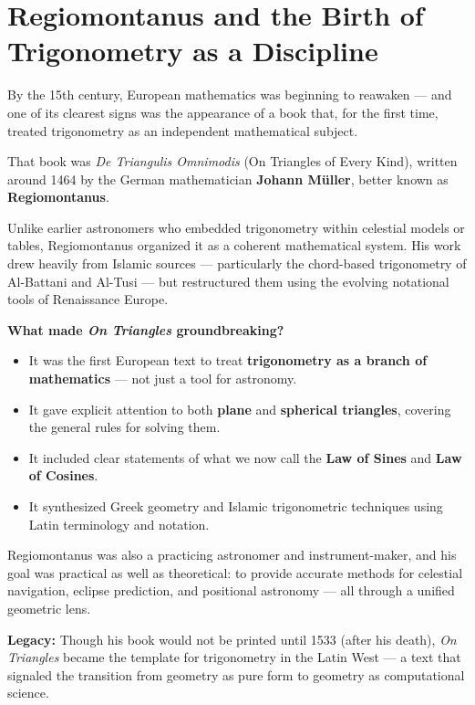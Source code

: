 \section{Regiomontanus and the Birth of Trigonometry as a Discipline}

By the 15th century, European mathematics was beginning to reawaken — and one of its clearest signs was the appearance of a book that, for the first time, treated trigonometry as an independent mathematical subject.

That book was \textit{De Triangulis Omnimodis} (On Triangles of Every Kind), written around 1464 by the German mathematician \textbf{Johann Müller}, better known as \textbf{Regiomontanus}.

Unlike earlier astronomers who embedded trigonometry within celestial models or tables, Regiomontanus organized it as a coherent mathematical system. His work drew heavily from Islamic sources — particularly the chord-based trigonometry of Al-Battani and Al-Tusi — but restructured them using the evolving notational tools of Renaissance Europe.

\textbf{What made \textit{On Triangles} groundbreaking?}

\begin{itemize}
  \item It was the first European text to treat \textbf{trigonometry as a branch of mathematics} — not just a tool for astronomy.
  \item It gave explicit attention to both \textbf{plane} and \textbf{spherical triangles}, covering the general rules for solving them.
  \item It included clear statements of what we now call the \textbf{Law of Sines} and \textbf{Law of Cosines}.
  \item It synthesized Greek geometry and Islamic trigonometric techniques using Latin terminology and notation.
\end{itemize}

Regiomontanus was also a practicing astronomer and instrument-maker, and his goal was practical as well as theoretical: to provide accurate methods for celestial navigation, eclipse prediction, and positional astronomy — all through a unified geometric lens.

\textbf{Legacy:} Though his book would not be printed until 1533 (after his death), \textit{On Triangles} became the template for trigonometry in the Latin West — a text that signaled the transition from geometry as pure form to geometry as computational science.

